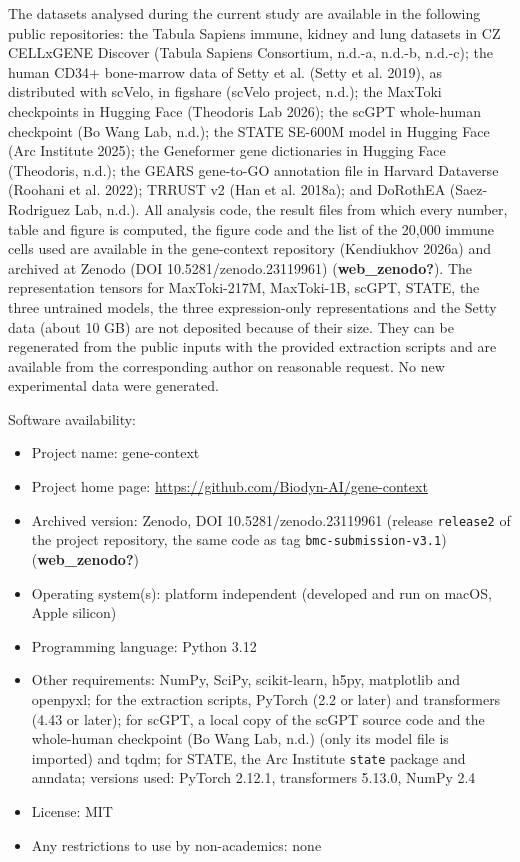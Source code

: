\documentclass[
  11pt,
]{article}
\newcounter{none} %
\providecommand{\tightlist}{%
  \setlength{\itemsep}{0pt}\setlength{\parskip}{0pt}}
\begin{document}
The datasets analysed during the current study are available in the
following public repositories: the Tabula Sapiens immune, kidney and
lung datasets in CZ CELLxGENE Discover (Tabula Sapiens Consortium,
n.d.-a, n.d.-b, n.d.-c); the human CD34+ bone-marrow data of Setty et
al. (Setty et al. 2019), as distributed with scVelo, in figshare
({scVelo project}, n.d.); the MaxToki checkpoints in Hugging Face
(Theodoris Lab 2026); the scGPT whole-human checkpoint (Bo Wang Lab,
n.d.); the STATE SE-600M model in Hugging Face (Arc Institute 2025); the
Geneformer gene dictionaries in Hugging Face (Theodoris, n.d.); the
GEARS gene-to-GO annotation file in Harvard Dataverse (Roohani et al.
2022); TRRUST v2 ({Han et al.} 2018a); and DoRothEA (Saez-Rodriguez Lab,
n.d.). All analysis code, the result files from which every number,
table and figure is computed, the figure code and the list of the 20,000
immune cells used are available in the gene-context repository
(Kendiukhov 2026a) and archived at Zenodo (DOI 10.5281/zenodo.23119961)
(\textbf{web\_zenodo?}). The representation tensors for MaxToki-217M,
MaxToki-1B, scGPT, STATE, the three untrained models, the three
expression-only representations and the Setty data (about 10 GB) are not
deposited because of their size. They can be regenerated from the public
inputs with the provided extraction scripts and are available from the
corresponding author on reasonable request. No new experimental data
were generated.

Software availability:

\begin{itemize}
\tightlist
\item
  Project name: gene-context
\item
  Project home page: \url{https://github.com/Biodyn-AI/gene-context}
\item
  Archived version: Zenodo, DOI 10.5281/zenodo.23119961 (release
  \texttt{release2} of the project repository, the same code as tag
  \texttt{bmc-submission-v3.1}) (\textbf{web\_zenodo?})
\item
  Operating system(s): platform independent (developed and run on macOS,
  Apple silicon)
\item
  Programming language: Python 3.12
\item
  Other requirements: NumPy, SciPy, scikit-learn, h5py, matplotlib and
  openpyxl; for the extraction scripts, PyTorch (2.2 or later) and
  transformers (4.43 or later); for scGPT, a local copy of the scGPT
  source code and the whole-human checkpoint (Bo Wang Lab, n.d.) (only
  its model file is imported) and tqdm; for STATE, the Arc Institute
  \texttt{state} package and anndata; versions used: PyTorch 2.12.1,
  transformers 5.13.0, NumPy 2.4
\item
  License: MIT
\item
  Any restrictions to use by non-academics: none
\end{itemize}
\end{document}
